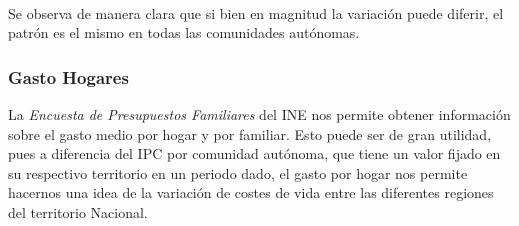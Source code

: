 \documentclass[11pt]{article}
\begin{document}
    \begin{center}
    \end{center}
    { \hspace*{\fill} \\}
    
    Se observa de manera clara que si bien en magnitud la variación puede
diferir, el patrón es el mismo en todas las comunidades autónomas.

    \subsubsection{Gasto Hogares}\label{gasto-hogares}

    La \emph{Encuesta de Presupuestos Familiares} del INE nos permite
obtener información sobre el gasto medio por hogar y por familiar. Esto
puede ser de gran utilidad, pues a diferencia del IPC por comunidad
autónoma, que tiene un valor fijado en su respectivo territorio en un
periodo dado, el gasto por hogar nos permite hacernos una idea de la
variación de costes de vida entre las diferentes regiones del territorio
Nacional.
\end{document}
